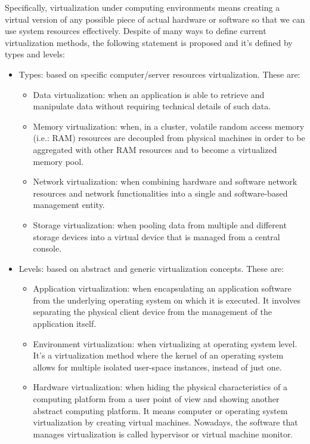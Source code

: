 Specifically, virtualization under computing environments means creating a virtual version of any possible piece of actual hardware or software so that we can use system resources effectively. Despite of many ways to define current virtualization methods, the following statement is proposed and it's defined by types and levels:

\begin{itemize}
\item Types: based on specific computer/server resources virtualization. These are: 
\begin{itemize}
\item Data virtualization: when an application is able to retrieve and manipulate data without requiring technical details of such data.
\item Memory virtualization: when, in a cluster, volatile random access memory (i.e.: RAM) resources are decoupled from physical machines in order to be aggregated with other RAM resources and to become a virtualized memory pool.
\item Network virtualization: when combining hardware and software network resources and network functionalities into a single and software-based management entity.
\item Storage virtualization: when pooling data from multiple and different storage devices into a virtual device that is managed from a central console.
\end{itemize}
\item Levels: based on abstract and generic virtualization concepts. These are:
\begin{itemize}
\item Application virtualization: when encapsulating an application software from the underlying operating system on which it is executed. It involves separating the physical client device from the management of the application itself.
\item Environment virtualization: when virtualizing at operating system level. It's a virtualization method where the kernel of an operating system allows for multiple isolated user-space instances, instead of just one. 
\item Hardware virtualization: when hiding the physical characteristics of a computing platform from a user point of view and showing another abstract computing platform. It means computer or operating system virtualization by creating virtual machines.  Nowadays, the software that manages virtualization is called hypervisor or virtual machine monitor.
\end{itemize}
\end{itemize}

